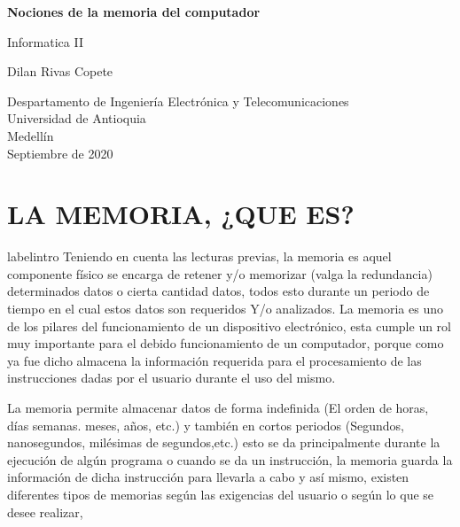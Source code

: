 \documentclass{article}
\begin{document}
\begin{titlepage}
    \begin{center}
        \vspace*{1cm}
            
        \Huge
        \textbf{Nociones de la memoria del computador }
            
        \vspace{0.5cm}
        \LARGE
       Informatica II
            
        \vspace{1.5cm}
            
        {Dilan Rivas Copete}
       
        
            
        \vfill
            
        \vspace{0.8cm}
            
        \Large
        Despartamento de Ingeniería Electrónica y Telecomunicaciones\\
        Universidad de Antioquia\\
        Medellín\\
        Septiembre de 2020
            
    \end{center}
\end{titlepage}

\tableofcontents
\newpage
\section{LA MEMORIA, ¿QUE ES?}label{intro}
Teniendo en cuenta las lecturas previas,  la memoria es aquel componente físico  se encarga de retener y/o memorizar (valga la redundancia) determinados datos o cierta cantidad datos, todos esto durante un periodo de tiempo en el cual estos datos son requeridos Y/o analizados. La memoria es uno de los  pilares del funcionamiento de un dispositivo electrónico, esta  cumple un rol muy importante para el debido funcionamiento  de un computador, porque como ya fue dicho almacena la información requerida para el procesamiento de las instrucciones dadas por el usuario durante el uso del mismo.

La memoria permite almacenar datos de forma indefinida (El orden de horas, días semanas. meses, años, etc.) y también en cortos periodos (Segundos, nanosegundos, milésimas de segundos,etc.) esto se da principalmente durante la ejecución de algún programa o cuando se da un instrucción, la memoria guarda la información de dicha instrucción para llevarla a cabo y así mismo, existen diferentes tipos de memorias según las exigencias del usuario o según lo que se desee realizar,
\end{document}
